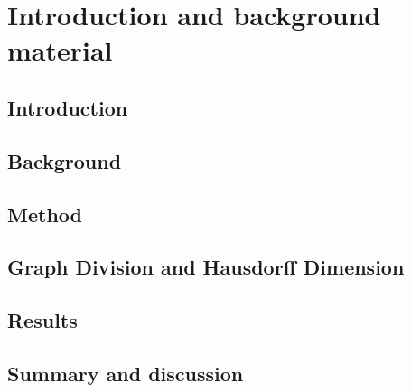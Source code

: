 \documentclass[nocoverpage,swedish,g5paper]{thesis}
\begin{document}
\begin{preface}

\end{preface}

\tableofcontents

\mainmatter

\part{Introduction and background material}

\chapter{Introduction}


\chapter{Background}\label{ch:Background}


\chapter{Method}\label{ch:Method}


\chapter{Graph Division and Hausdorff Dimension}\label{ch:GraphDivisionandHausdorffDim}


%

\chapter{Results}\label{ch:Results}


\chapter{Summary and discussion}\label{ch:Summary}




%



\end{document}

